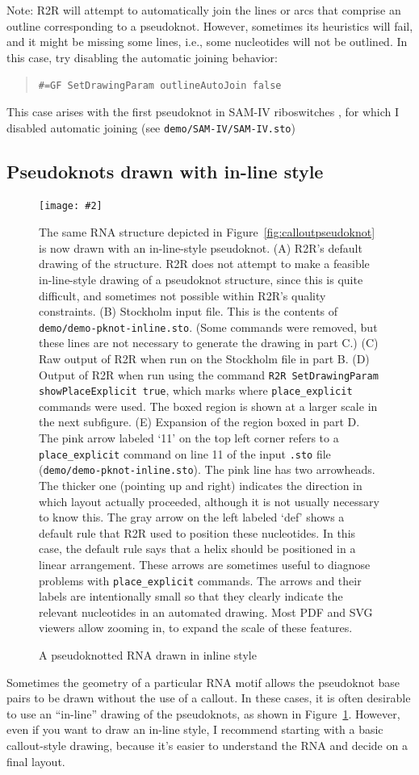 \documentclass[letterpaper,12pt]{report}
\newcommand{\fig}[4]{
\begin{figure}
\texttt{[image: \#2]}
\caption{#3}

\begin{small}
#4
\end{small}
\label{#1}
\end{figure}
}
\newcommand{\example}[1]{
\begin{quote}
{\raggedright
#1
}
\end{quote}
}
\newcommand{\examplett}[1]{
\example{{\tt #1}}
}
\begin{document}
Note: R2R will attempt to automatically join the lines or arcs that comprise an outline corresponding to a pseudoknot.  However, sometimes its heuristics will fail, and it might be missing some lines, i.e., some nucleotides will not be outlined.  In this case, try disabling the automatic joining behavior:
\examplett{\#=GF SetDrawingParam outlineAutoJoin false}
This case arises with the first pseudoknot in SAM-IV riboswitches \cite{SAMIV}, for which I disabled automatic joining (see {\tt demo/SAM-IV/SAM-IV.sto})

\subsection{Pseudoknots drawn with in-line style}
\label{sec:inlinepseudoknot}
\fig{fig:inlinepseudoknot}{figures/demo-pknot-inline.pdf}{A pseudoknotted RNA drawn in inline style}{
The same RNA structure depicted in Figure~\ref{fig:calloutpseudoknot} is now drawn
with an in-line-style pseudoknot.
(A)
R2R's default drawing of the structure.  R2R does not attempt to make a feasible
in-line-style drawing of a pseudoknot structure, since this is quite difficult, and sometimes not possible
within R2R's quality constraints.
(B)
Stockholm input file.
This is the contents of {\tt demo/demo-pknot-inline.sto}.
(Some commands were removed, but these lines are not necessary to generate the drawing in part C.)
(C)
Raw output of R2R when run on the Stockholm file in part B.
(D)
Output of R2R when run using the command {\tt R2R SetDrawingParam showPlaceExplicit true}, which marks where {\tt place\_explicit}
commands were used.  The boxed region is shown at a larger scale in the next subfigure.
(E)
Expansion of the region boxed in part D.  The pink arrow labeled `11' on the top left corner refers to a {\tt place\_explicit} command
on line 11 of the input {\tt .sto} file ({\tt demo/demo-pknot-inline.sto}).  The pink line has two arrowheads.  The thicker one (pointing up and right)
indicates the direction in which layout actually proceeded, although it is not usually necessary to know this.
The gray arrow on the left labeled `def' shows a default rule that R2R used to position
these nucleotides.  In this case, the default rule says that a helix should be positioned
in a linear arrangement.
These arrows are sometimes useful to diagnose problems with {\tt place\_explicit} commands.
The arrows and their labels are intentionally small so that they clearly indicate the relevant nucleotides in
an automated drawing.  Most PDF and SVG viewers allow zooming in, to expand the scale of these features.
}
Sometimes the geometry of a particular RNA motif allows the pseudoknot base pairs to be drawn without the use of a callout.  In these cases, it is often desirable to use an ``in-line'' drawing of the pseudoknots, as shown in Figure~\ref{fig:inlinepseudoknot}.
However, even if you want to draw an in-line style, I recommend starting with a basic callout-style drawing, because it's easier to understand the RNA and decide on a final layout.
\end{document}
